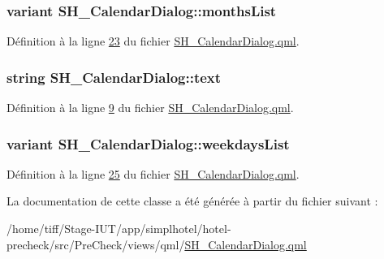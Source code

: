 \hypertarget{classSH__CalendarDialog_a86a4ef51cbfb7299a55bbddf2ae60f6a}{
\subsubsection[{months\-List}]{\setlength{\rightskip}{0pt plus 5cm}variant S\-H\-\_\-\-Calendar\-Dialog\-::months\-List}}\label{classSH__CalendarDialog_a86a4ef51cbfb7299a55bbddf2ae60f6a}


Définition à la ligne \hyperlink{SH__CalendarDialog_8qml_source_l00023}{23} du fichier \hyperlink{SH__CalendarDialog_8qml_source}{S\-H\-\_\-\-Calendar\-Dialog.\-qml}.

\hypertarget{classSH__CalendarDialog_af074ec0c262421e8bdb58357e06985fa}{
\subsubsection[{text}]{\setlength{\rightskip}{0pt plus 5cm}string S\-H\-\_\-\-Calendar\-Dialog\-::text}}\label{classSH__CalendarDialog_af074ec0c262421e8bdb58357e06985fa}


Définition à la ligne \hyperlink{SH__CalendarDialog_8qml_source_l00009}{9} du fichier \hyperlink{SH__CalendarDialog_8qml_source}{S\-H\-\_\-\-Calendar\-Dialog.\-qml}.

\hypertarget{classSH__CalendarDialog_a4ceac0c8c8f2b0d05060ddd66986b8e0}{
\subsubsection[{weekdays\-List}]{\setlength{\rightskip}{0pt plus 5cm}variant S\-H\-\_\-\-Calendar\-Dialog\-::weekdays\-List}}\label{classSH__CalendarDialog_a4ceac0c8c8f2b0d05060ddd66986b8e0}


Définition à la ligne \hyperlink{SH__CalendarDialog_8qml_source_l00025}{25} du fichier \hyperlink{SH__CalendarDialog_8qml_source}{S\-H\-\_\-\-Calendar\-Dialog.\-qml}.



La documentation de cette classe a été générée à partir du fichier suivant \-:\begin{DoxyCompactItemize}
\item 
/home/tiff/\-Stage-\/\-I\-U\-T/app/simplhotel/hotel-\/precheck/src/\-Pre\-Check/views/qml/\hyperlink{SH__CalendarDialog_8qml}{S\-H\-\_\-\-Calendar\-Dialog.\-qml}\end{DoxyCompactItemize}
